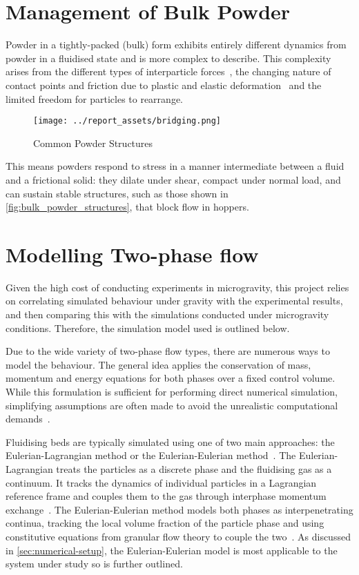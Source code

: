 \section{Management of Bulk Powder}\label{sec:bulk-powder}
Powder in a tightly-packed (bulk) form exhibits entirely different dynamics from powder in a fluidised state and is more complex to describe. This complexity arises from the different types of interparticle forces~\cite{ZAFAR2017389}, the changing nature of contact points and friction due to plastic and elastic deformation~\cite{TALEBI2024211} and the limited freedom for particles to rearrange. 
\begin{figure}[htbp]
    \centering
    \begin{minipage}{0.6\textwidth}
        \centering
        \texttt{[image: ../report\_assets/bridging.png]}
        \caption{Common Powder Structures~\cite{911Metallurgist_binsflow}}\label{fig:bulk_powder_structures}
    \end{minipage}
\end{figure}
This means powders respond to stress in a manner intermediate between a fluid and a frictional solid: they dilate under shear, compact under normal load, and can sustain stable structures, such as those shown in \autoref{fig:bulk_powder_structures}, that block flow in hoppers. 
\section{Modelling Two-phase flow}
Given the high cost of conducting experiments in microgravity, this project relies on correlating simulated behaviour under gravity with the experimental results, and then comparing this with the simulations conducted under microgravity conditions. Therefore, the simulation model used is outlined below.

Due to the wide variety of two-phase flow types, there are numerous ways to model the behaviour.  The general idea applies the conservation of mass, momentum and energy equations for both phases over a fixed control volume. While this formulation is sufficient for performing direct numerical simulation, simplifying assumptions are often made to avoid the unrealistic computational demands~\cite{enwald1996eulerian}. 

Fluidising beds are typically simulated using one of two main approaches: the Eulerian-Lagrangian method or the Eulerian-Eulerian method~\cite{C6RA28615A}. The Eulerian-Lagrangian treats the particles as a discrete phase and the fluidising gas as a continuum. It tracks the dynamics of individual particles in a Lagrangian reference frame and couples them to the gas through interphase momentum exchange~\cite{SUBRAMANIAM2013215}. The Eulerian-Eulerian method models both phases as interpenetrating continua, tracking the local volume fraction of the particle phase and using constitutive equations from granular flow theory to couple the two~\cite{C6RA28615A}. As discussed in \autoref{sec:numerical-setup}, the Eulerian-Eulerian model is most applicable to the system under study so is further outlined.


